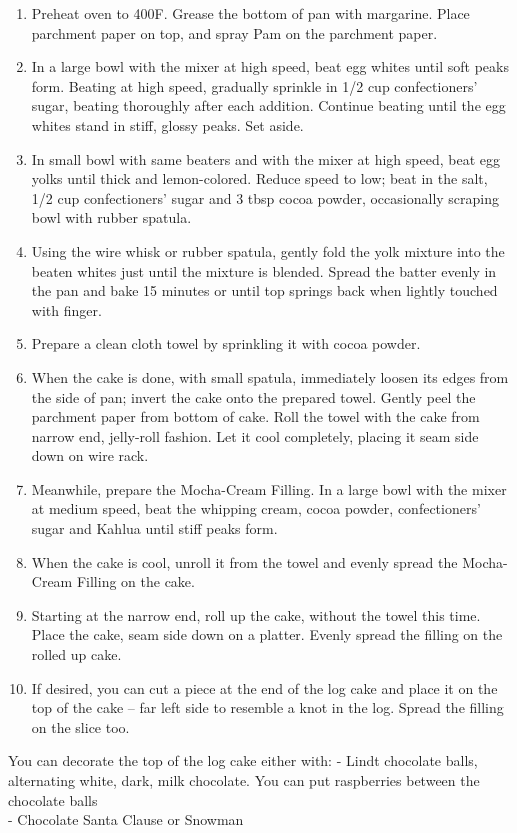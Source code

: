 \begin{enumerate}
    \item Preheat oven to 400\degree F. Grease the bottom of pan with margarine. Place parchment paper on top, and spray Pam on the parchment paper.
    \item In a large bowl with the mixer at high speed, beat egg whites until soft peaks form. Beating at high speed, gradually sprinkle in 1/2 cup confectioners’ sugar, beating thoroughly after each addition. Continue beating until the egg whites stand in stiff, glossy peaks. Set aside.
    \item In small bowl with same beaters and with the mixer at high speed, beat egg yolks until thick and lemon-colored. Reduce speed to low; beat in the salt, 1/2 cup confectioners’ sugar and 3 tbsp cocoa powder, occasionally scraping bowl with rubber spatula.
    \item Using the wire whisk or rubber spatula, gently fold the yolk mixture into the beaten whites just until the mixture is blended. Spread the batter evenly in the pan and bake 15 minutes or until top springs back when lightly touched with finger.
    \item Prepare a clean cloth towel by sprinkling it with cocoa powder.
    \item When the cake is done, with small spatula, immediately loosen its edges from the side of pan; invert the cake onto the prepared towel. Gently peel the parchment paper from bottom of cake. Roll the towel with the cake from narrow end, jelly-roll fashion. Let it cool completely, placing it seam side down on wire rack.
    \item Meanwhile, prepare the Mocha-Cream Filling. In a large bowl with the mixer at medium speed, beat the whipping cream, cocoa powder, confectioners’ sugar and Kahlua until stiff peaks form.
    \item When the cake is cool, unroll it from the towel and evenly spread the Mocha-Cream Filling on the cake.
    \item Starting at the narrow end, roll up the cake, without the towel this time. Place the cake, seam side down on a platter. Evenly spread the filling on the rolled up cake.
    \item If desired, you can cut a piece at the end of the log cake and place it on the top of the cake – far left side to resemble a knot in the log. Spread the filling on the slice too.
\end{enumerate}

You can decorate the top of the log cake either with:
\vspace*{\baselineskip}
- Lindt chocolate balls, alternating white, dark, milk chocolate. You can put raspberries between the chocolate balls \\
- Chocolate Santa Clause or Snowman


